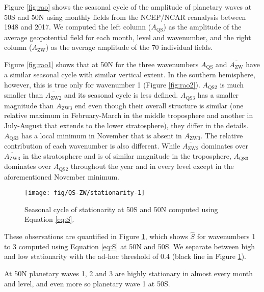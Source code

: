 \documentclass[draft,linenumbers]{agujournal2018}
\begin{document}
Figure \ref{fig:rao} shows the seasonal cycle of the amplitude of
planetary waves at 50\degree S and 50\degree N using monthly fields from
the NCEP/NCAR reanalysis \citep{Kalnay1996} between 1948 and 2017. We
computed the left column (\(A_\mathrm{QS}\)) as the amplitude of the
average geopotential field for each month, level and wavenumber, and the
right column (\(\overline{A_\mathrm{ZW}}\)) as the average amplitude of
the 70 individual fields.

Figure \ref{fig:rao1} shows that at 50\degree N for the three
wavenumbers \(A_\mathrm{QS}\) and \(\overline{A_\mathrm{ZW}}\) have a
similar seasonal cycle with similar vertical extent. In the southern
hemisphere, however, this is true only for wavenumber 1 (Figure
\ref{fig:rao2}). \(A_\mathrm{QS2}\) is much smaller than
\(\overline{A_\mathrm{ZW2}}\) and its seasonal cycle is less defined.
\(A_\mathrm{QS3}\) has a smaller magnitude than
\(\overline{A_\mathrm{ZW3}}\) end even though their overall structure is
similar (one relative maximum in February-March in the middle
troposphere and another in July-August that extends to the lower
stratosphere), they differ in the details. \(A_\mathrm{QS3}\) has a
local minimum in November that is absent in
\(\overline{A_\mathrm{ZW3}}\). The relative contribution of each
wavenumber is also different. While \(\overline{A_\mathrm{ZW2}}\)
dominates over \(\overline{A_\mathrm{ZW3}}\) in the stratosphere and is
of similar magnitude in the troposphere, \(A_\mathrm{QS3}\) dominates
over \(A_\mathrm{QS2}\) throughout the year and in every level except in
the aforementioned November minimum.

\begin{figure}[h]

{\centering \texttt{[image: fig/QS-ZW/stationarity-1]} 

}

\caption{Seasonal cycle of stationarity at 50\degree S and 50\degree N computed using Equation \ref{eq:S}.}\label{fig:stationarity}
\end{figure}

These observations are quantified in Figure \ref{fig:stationarity},
which shows \(\hat{S}\) for wavenumbers 1 to 3 computed using Equation
\ref{eq:S} at 50\degree N and 50\degree S. We separate between high and
low stationarity with the ad-hoc threshold of 0.4 (black line in Figure
\ref{fig:stationarity}).

At 50\degree N planetary waves 1, 2 and 3 are highly stationary in
almost every month and level, and even more so planetary wave 1 at
50\degree S.
\end{document}

